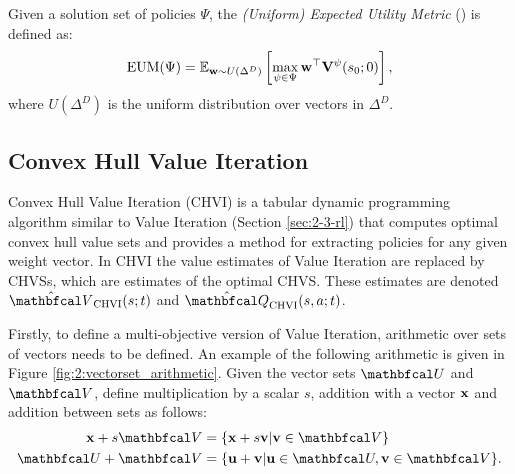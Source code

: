 \begin{defn}
    \label{def:2:eum}
    Given a solution set of policies $\Psi$, the \textit{(Uniform) Expected Utility Metric} (\eum) is defined as:
    \begin{align}
        {\textnormal{EUM}}(\Psi) = \mathbb{E}_{\mathbf{w}\sim U(\Delta^D)}\left[
            \max_{\psi\in\Psi} \mathbf{w}^\top \mathbf{V}^{\psi}(s_0;0)
         \right],
    \end{align}
    where $U(\Delta^D)$ is the uniform distribution over vectors in $\Delta^D$.
\end{defn}





\subsection{Convex Hull Value Iteration}
\label{sec:2-6-1-chvi}

    Convex Hull Value Iteration (CHVI) \cite{chvi} is a tabular dynamic programming algorithm similar to Value Iteration (Section \ref{sec:2-3-rl}) that computes optimal convex hull value sets and provides a method for extracting policies for any given weight vector. %
    In CHVI the value estimates of Value Iteration are replaced by CHVSs, which are estimates of the optimal CHVS. These estimates are denoted $\Vchvi(s;t)$ and $\Qchvi(s,a;t)$.

    Firstly, to define a multi-objective version of Value Iteration, arithmetic over sets of vectors needs to be defined. An example of the following arithmetic is given in Figure \ref{fig:2:vectorset_arithmetic}. Given the vector sets $\bfcl{U}$ and $\bfcl{V}$, define multiplication by a scalar $s$, addition with a vector $\mathbf{x}$ and addition between sets as follows:
    \begin{align}
        \bff{x} + s\bfcl{V} &= \{\bff{x} + s\bff{v} | \bff{v}\in\bfcl{V} \} \label{eq:2:vector_set_arithmetic_one} \\
        \bfcl{U} + \bfcl{V} &= \{ \bff{u}+\bff{v} | \bff{u}\in\bfcl{U}, \bff{v}\in\bfcl{V} \}. \label{eq:2:vector_set_arithmetic_two} 
    \end{align}

